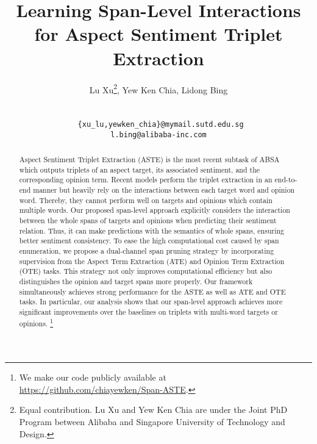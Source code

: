 \documentclass[11pt,a4paper]{article}
\title{Learning Span-Level Interactions for Aspect Sentiment Triplet Extraction}
\author{Lu Xu\affmark[* 1, 2]\thanks{ Equal contribution.  Lu Xu and Yew Ken Chia are under the Joint PhD Program between Alibaba and Singapore University of Technology and Design. },
Yew Ken Chia\affmark[* 1, 2], Lidong Bing\affmark[2]\\
\affaddr{\affmark[1] Singapore University of Technology and Design}\\
\affaddr{\affmark[2] DAMO Academy, Alibaba Group}\\
\tt{ \{xu\_lu,yewken\_chia\}@mymail.sutd.edu.sg}\\
\tt{l.bing@alibaba-inc.com}\\
}
\date{}
\begin{document}
\maketitle
\begin{abstract} 
Aspect Sentiment Triplet Extraction (ASTE) is the most recent subtask of ABSA which outputs triplets of an aspect target, its associated sentiment, and the corresponding opinion term.
Recent models perform the triplet extraction in an end-to-end manner but heavily rely on the interactions 
between each target word and opinion word.
Thereby, they cannot perform well on targets and opinions which contain multiple words.
Our proposed span-level approach explicitly considers the interaction between the whole spans of targets and opinions when predicting their sentiment relation.
Thus, it can make predictions with the semantics of whole spans, ensuring better sentiment consistency.
To ease the high computational cost caused by span enumeration, we propose a dual-channel span pruning strategy by incorporating supervision from the Aspect Term Extraction (ATE) and Opinion Term Extraction (OTE) tasks.
This strategy not only improves computational efficiency but also distinguishes the opinion and target spans more properly.
Our framework simultaneously achieves strong performance for the ASTE as well as ATE and OTE tasks.
In particular, our analysis shows that our span-level approach achieves more significant improvements over the baselines on triplets with multi-word targets or opinions.
\footnote{We make our code publicly available at \url{https://github.com/chiayewken/Span-ASTE}.}

\end{abstract}
\end{document}
